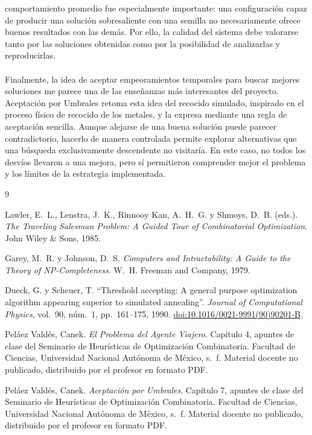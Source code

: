 \documentclass[12pt]{article}
\begin{document}
comportamiento promedio fue especialmente importante: una
configuración capaz de producir una solución sobresaliente con una
semilla no necesariamente ofrece buenos resultados con las demás.
Por ello, la calidad del sistema debe valorarse tanto por las
soluciones obtenidas como por la posibilidad de analizarlas y
reproducirlas.
\\\\
Finalmente, la idea de aceptar empeoramientos temporales para buscar
mejores soluciones me parece una de las enseñanzas más interesantes
del proyecto. Aceptación por Umbrales retoma esta idea del recocido
simulado, inspirado en el proceso físico de recocido de los metales,
y la expresa mediante una regla de aceptación sencilla. Aunque
alejarse de una buena solución puede parecer contradictorio, hacerlo
de manera controlada permite explorar alternativas que una búsqueda
exclusivamente descendente no visitaría. En este caso, no todos los
desvíos llevaron a una mejora, pero sí permitieron comprender mejor
el problema y los límites de la estrategia implementada.

\clearpage

\clearpage
\renewcommand{\refname}{Bibliografía}

\begin{thebibliography}{9}

Lawler, E.~L., Lenstra, J.~K., Rinnooy Kan, A.~H.~G.
y Shmoys, D.~B. (eds.).
\textit{The Traveling Salesman Problem:
A Guided Tour of Combinatorial Optimization}.
John Wiley \& Sons, 1985.

Garey, M.~R. y Johnson, D.~S.
\textit{Computers and Intractability:
A Guide to the Theory of NP-Completeness}.
W.~H. Freeman and Company, 1979.

Dueck, G. y Scheuer, T.
``Threshold accepting: A general purpose optimization
algorithm appearing superior to simulated annealing''.
\textit{Journal of Computational Physics},
vol.~90, núm.~1, pp.~161--175, 1990.
\href{https://doi.org/10.1016/0021-9991(90)90201-B}
{doi:10.1016/0021-9991(90)90201-B}.

Peláez Valdés, Canek.
\textit{El Problema del Agente Viajero}.
Capítulo 4, apuntes de clase del Seminario de Heurísticas
de Optimización Combinatoria.
Facultad de Ciencias, Universidad Nacional Autónoma de México,
s.~f.
Material docente no publicado, distribuido por el profesor
en formato PDF.

Peláez Valdés, Canek.
\textit{Aceptación por Umbrales}.
Capítulo 7, apuntes de clase del Seminario de Heurísticas
de Optimización Combinatoria.
Facultad de Ciencias, Universidad Nacional Autónoma de México,
s.~f.
Material docente no publicado, distribuido por el profesor
en formato PDF.

\end{thebibliography}
\end{document}
